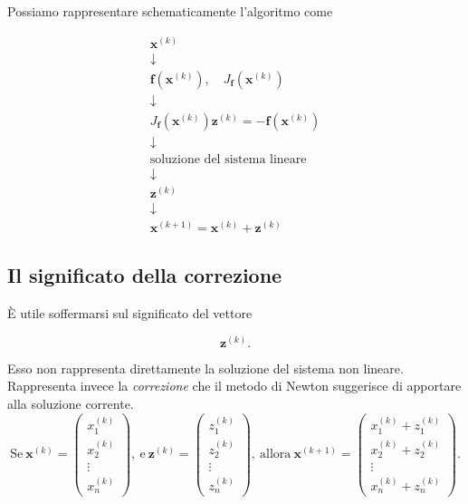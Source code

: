 Possiamo rappresentare schematicamente l'algoritmo come

\begin{equation*}
\boxed{
\begin{array}{c}
\mathbf{x}^{(k)}\\
\downarrow\\
\mathbf{f}(\mathbf{x}^{(k)}),
\quad
J_{\mathbf{f}}(\mathbf{x}^{(k)})\\
\downarrow\\
J_{\mathbf{f}}(\mathbf{x}^{(k)})
\mathbf{z}^{(k)}
=
-\mathbf{f}(\mathbf{x}^{(k)})\\
\downarrow\\
\text{soluzione del sistema lineare}\\
\downarrow\\
\mathbf{z}^{(k)}\\
\downarrow\\
\mathbf{x}^{(k+1)}
=
\mathbf{x}^{(k)}+\mathbf{z}^{(k)}
\end{array}}
\end{equation*}


\subsection{Il significato della correzione}

È utile soffermarsi sul significato del vettore

\begin{equation*}
    \mathbf{z}^{(k)}.
\end{equation*}

Esso non rappresenta direttamente la soluzione del sistema
non lineare. Rappresenta invece la \emph{correzione} che il metodo
di Newton suggerisce di apportare alla soluzione corrente.
\begin{equation*}
	\text{Se} \
    \mathbf{x}^{(k)}
    =
    \begin{pmatrix}
        x_1^{(k)}\\
        x_2^{(k)}\\
        \vdots\\
        x_n^{(k)}
    \end{pmatrix}
    ,\ \text{e} \
    \mathbf{z}^{(k)}
    =
    \begin{pmatrix}
        z_1^{(k)}\\
        z_2^{(k)}\\
        \vdots\\
        z_n^{(k)}
    \end{pmatrix},
    \ \text{allora} \
    \mathbf{x}^{(k+1)}
    =
    \begin{pmatrix}
        x_1^{(k)}+z_1^{(k)}\\
        x_2^{(k)}+z_2^{(k)}\\
        \vdots\\
        x_n^{(k)}+z_n^{(k)}
    \end{pmatrix}.
\end{equation*}

